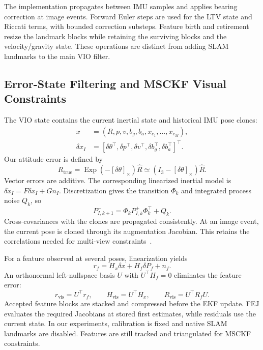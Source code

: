 \documentclass[a4paper,runningheads,twocolumn]{llncs}
\newcommand{\sk}[1]{[#1]_{\times}}
\newcommand{\Exp}{\operatorname{Exp}}
\begin{document}
The implementation propagates between IMU samples and applies bearing correction at image events. Forward Euler steps are used for the LTV state and Riccati terms, with bounded correction substeps. Feature birth and retirement resize the landmark blocks while retaining the surviving blocks and the velocity/gravity state. These operations are distinct from adding SLAM landmarks to the main VIO filter.

\subsection{Error-State Filtering and MSCKF Visual Constraints}
The VIO state contains the current inertial state and historical IMU pose clones:
\begin{equation}
 \begin{aligned}
 x&=(R,p,v,b_g,b_a,x_{c_1},\ldots,x_{c_M}),\\
 \delta x_I&=[\delta\theta^\top,\delta p^\top,\delta v^\top,
              \delta b_g^\top,\delta b_a^\top]^\top .
 \end{aligned}
\end{equation}
Our attitude error is defined by
\begin{equation}
 R_{\mathrm{true}}=\Exp(-\sk{\delta\theta})\hat R
       \simeq (I_3-\sk{\delta\theta})\hat R .
 \label{eq:attitudeerror}
\end{equation}
Vector errors are additive. The corresponding linearized inertial model is
$\delta\dot x_I=F\delta x_I+Gn_I$. Discretization gives the transition $\Phi_k$ and integrated process noise $Q_k$, so
\begin{equation}
 P_{I,k+1}^-=\Phi_kP_{I,k}^+\Phi_k^\top+Q_k .
 \label{eq:covprop}
\end{equation}
Cross-covariances with the clones are propagated consistently. At an image event, the current pose is cloned through its augmentation Jacobian. This retains the correlations needed for multi-view constraints~\cite{sun2018,geneva2020}.

For a feature observed at several poses, linearization yields
\begin{equation}
 r_f=H_x\delta x+H_f\delta P_f+n_f .
\end{equation}
An orthonormal left-nullspace basis $U$ with $U^\top H_f=0$ eliminates the feature error:
\begin{equation}
 r_{\mathrm{vis}}=U^\top r_f,\qquad
 H_{\mathrm{vis}}=U^\top H_x,\qquad
 R_{\mathrm{vis}}=U^\top R_fU .
 \label{eq:msckf}
\end{equation}
Accepted feature blocks are stacked and compressed before the EKF update. FEJ evaluates the required Jacobians at stored first estimates, while residuals use the current state. In our experiments, calibration is fixed and native SLAM landmarks are disabled. Features are still tracked and triangulated for MSCKF constraints.
\end{document}
